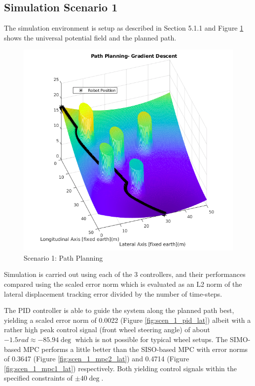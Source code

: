 \documentclass[a4paper, twocolumn]{article}
\begin{document}
\subsection{Simulation Scenario 1}
The simulation environment is setup as described in Section 5.1.1 and Figure \ref{fig:scen_1_apf} shows the universal potential field and the planned path. 

\begin{figure}
    \centering
    \includegraphics[scale=0.3]{img/scenario_1/apf.png}
    \caption{Scenario 1: Path Planning}
    \label{fig:scen_1_apf}
\end{figure}

Simulation is carried out using each of the 3 controllers, 
and their performances compared using the scaled error norm which is evaluated as an L2 norm of the lateral displacement tracking error divided by the number of time-steps. 

The PID controller is able to guide the system along the planned path best, yielding a scaled error norm of 0.0022 (Figure \ref{fig:scen_1_pid_lat}) 
albeit with a rather high peak control signal (front wheel steering angle) of about $-1.5rad \approx -85.94\deg$ which is not possible for typical wheel setups. 
The SIMO-based MPC performs a little better than the SISO-based MPC with error norms of 0.3647 (Figure \ref{fig:scen_1_mpc2_lat}) and 0.4714 (Figure \ref{fig:scen_1_mpc1_lat}) respectively. 
Both yielding control signals within the specified constraints of $\pm40\deg$. 
\end{document}

